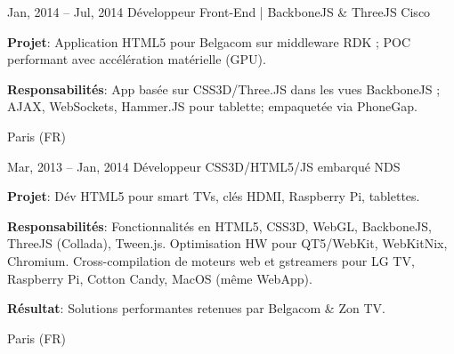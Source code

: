 \documentclass[
  a4paper,
   maincolor=cvblue,
   sectioncolor=cvblue,
   sidebarwidth=0.323\paperwidth,
]{fortysecondscv}
\begin{document}
\newpage
\makethirdsidebar

\vspace*{-1em} %
\begin{cvtableNew}
  \cvitemRightNew
    {Jan, 2014 – Jul, 2014} %
    {Développeur Front-End | BackboneJS \& ThreeJS} %
    {Cisco} %
    {
      \vspace{1pt}
      \fontsize{10.8pt}{12pt}\selectfont %
      \textbf{Projet}: Application HTML5 pour Belgacom sur middleware RDK ; POC performant avec accélération matérielle (GPU).\par
      \vspace{4pt}
      \textbf{Responsabilités}: App basée sur CSS3D/Three.JS dans les vues BackboneJS ; AJAX, WebSockets, Hammer.JS pour tablette; empaquetée via PhoneGap.\par
    }
    {Paris (FR)} %

    \vspace{1.57mm} %


  \cvitemRightNew
    {Mar, 2013 – Jan, 2014} %
    {Développeur CSS3D/HTML5/JS embarqué} %
    {NDS} %
    {
      \vspace{1pt}
      \fontsize{10.8pt}{12pt}\selectfont %
      \textbf{Projet}: Dév HTML5 pour smart TVs, clés HDMI, Raspberry Pi, tablettes.\par
      \vspace{4pt}
      \textbf{Responsabilités}: Fonctionnalités en HTML5, CSS3D, WebGL, BackboneJS, ThreeJS (Collada), Tween.js. Optimisation HW pour QT5/WebKit, WebKitNix, Chromium. Cross-compilation de moteurs web et gstreamers pour LG TV, Raspberry Pi, Cotton Candy, MacOS (même WebApp).\par
      \vspace{4pt}
      \textbf{Résultat}: Solutions performantes retenues par Belgacom \& Zon TV.\par
    }
    {Paris (FR)} %

    \vspace{1.57mm} %


\end{cvtableNew}
\end{document}
